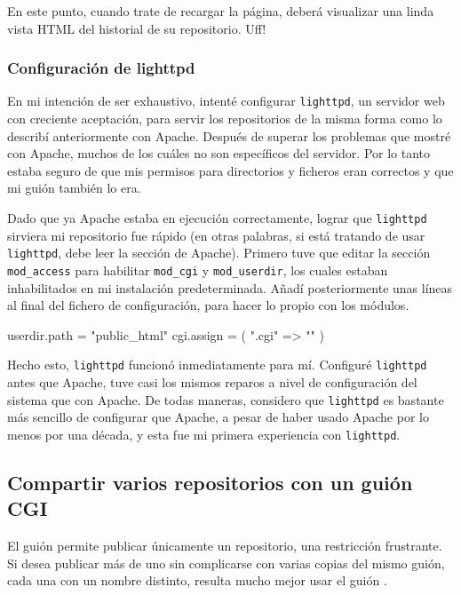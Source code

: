 En este punto, cuando trate de recargar la página, deberá visualizar
una linda vista HTML del historial de su repositorio. Uff!

\subsubsection{Configuración de lighttpd}

En mi intención de ser exhaustivo, intenté configurar
\texttt{lighttpd}, un servidor web con creciente aceptación, para
servir los repositorios de la misma forma como lo describí
anteriormente con Apache. Después de superar los problemas que mostré
con Apache, muchos de los cuáles no son específicos del servidor.  Por
lo tanto estaba seguro de que mis permisos para directorios y ficheros
eran correctos y que mi guión  también lo era.

Dado que ya Apache estaba en ejecución correctamente, lograr que
\texttt{lighttpd} sirviera mi repositorio fue rápido (en otras
palabras, si está tratando de usar \texttt{lighttpd}, debe leer la
sección de Apache).  Primero tuve que editar la sección
\texttt{mod\_access} para habilitar \texttt{mod\_cgi} y
\texttt{mod\_userdir}, los cuales estaban inhabilitados en mi
instalación predeterminada.  Añadí posteriormente unas líneas al final
del fichero de configuración, para hacer lo propio con los módulos.
\begin{codesample2}
  userdir.path = "public_html"
  cgi.assign = ( ".cgi" => "" )
\end{codesample2}
Hecho esto, \texttt{lighttpd} funcionó inmediatamente para
mí. Configuré \texttt{lighttpd} antes que Apache, tuve casi los mismos
reparos a nivel de configuración del sistema que con Apache.  De todas
maneras, considero que \texttt{lighttpd} es bastante más sencillo de
configurar que Apache, a pesar de haber usado Apache por lo menos por
una década, y esta fue mi primera experiencia con \texttt{lighttpd}.

\subsection{Compartir varios repositorios con un guión CGI}

El guión  permite publicar únicamente un
repositorio, una restricción frustrante.  Si desea publicar más de uno
sin complicarse con varias copias del mismo guión, cada una con un
nombre distinto, resulta mucho mejor usar el guión
.

